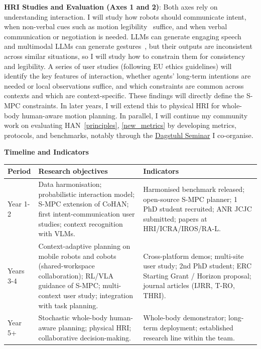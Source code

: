 \documentclass[11pt]{article}
\renewcommand{\arraystretch}{1.35}
\newcommand{\boldheading}[1]{\par\vspace{4pt}{\bfseries #1\par}\vspace{2pt}}
\begin{document}
\vspace{0.5ex}
\noindent \textbf{{HRI Studies and Evaluation (Axes 1 and 2)}}: Both axes rely on understanding interaction. I will study how robots should communicate intent, when non-verbal cues such as motion legibility~\cite{schmidt2024investigating} suffice, and when verbal communication or negotiation is needed. LLMs can generate engaging speech~\cite{song2025goat} and multimodal LLMs can generate gestures~\cite{soton506590}, but their outputs are inconsistent across similar situations, so I will study how to constrain them for consistency and legibility. A series of user studies (following EU ethics guidelines) will identify the key features of interaction, whether agents' long-term intentions are needed or local observations suffice, and which constraints are common across contexts and which are context-specific. These findings will directly define the S-MPC constraints. In later years, I will extend this to physical HRI for whole-body human-aware motion planning. In parallel, I will continue my community work on evaluating HAN~\ref{principles}, \ref{new_metrics} by developing metrics, protocols, and benchmarks, notably through the \href{https://www.dagstuhl.de/seminars/seminar-calendar/seminar-details/27131}{Dagstuhl Seminar} I co-organise.

\boldheading{{Work Plan and Risks}}
\vspace{1ex}
\noindent \textbf{{Timeline and Indicators}}\\[4pt]
{\fontsize{10}{12}\selectfont\renewcommand{\arraystretch}{1.15}
\begin{tabularx}{\linewidth}{|L{14mm}|Y|Y|}
\hline {}\bfseries Period & \bfseries Research objectives & \bfseries Indicators\\
\hline Year 1-2 & Data harmonisation; probabilistic interaction model; S-MPC extension of CoHAN; first intent-communication user studies; context recognition with VLMs. & Harmonised benchmark released; open-source S-MPC planner; 1 PhD student recruited; ANR JCJC submitted; papers at HRI/ICRA/IROS/RA-L.\\
\hline Years 3-4 & Context-adaptive planning on mobile robots and cobots (shared-workspace collaboration); RL/VLA guidance of S-MPC; multi-context user study; integration with task planning. & Cross-platform demos; multi-site user study; 2nd PhD student; ERC Starting Grant / Horizon proposal; journal articles (IJRR, T-RO, THRI).\\
\hline Year 5+ & Stochastic whole-body human-aware planning; physical HRI; collaborative decision-making. & Whole-body demonstrator; long-term deployment; established research line within the team.\\
\hline
\end{tabularx}\par}
\end{document}
